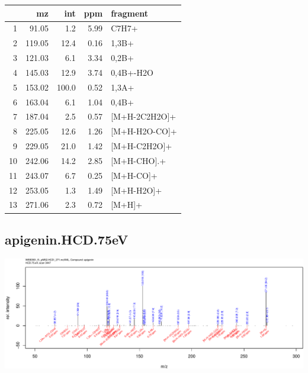\documentclass[]{article}
\begin{document}
\begin{table}[ht]
\centering
\begin{tabular}{rrrrl}
  \toprule
 & mz & int & ppm & fragment \\ 
  \midrule
1 & 91.05 & 1.2 & 5.99 & C7H7+ \\ 
  2 & 119.05 & 12.4 & 0.16 & 1,3B+ \\ 
  3 & 121.03 & 6.1 & 3.34 & 0,2B+ \\ 
  4 & 145.03 & 12.9 & 3.74 & 0,4B+-H2O \\ 
  5 & 153.02 & 100.0 & 0.52 & 1,3A+ \\ 
  6 & 163.04 & 6.1 & 1.04 & 0,4B+ \\ 
  7 & 187.04 & 2.5 & 0.57 & [M+H-2C2H2O]+ \\ 
  8 & 225.05 & 12.6 & 1.26 & [M+H-H2O-CO]+ \\ 
  9 & 229.05 & 21.0 & 1.42 & [M+H-C2H2O]+ \\ 
  10 & 242.06 & 14.2 & 2.85 & [M+H-CHO].+ \\ 
  11 & 243.07 & 6.7 & 0.25 & [M+H-CO]+ \\ 
  12 & 253.05 & 1.3 & 1.49 & [M+H-H2O]+ \\ 
  13 & 271.06 & 2.3 & 0.72 & [M+H]+ \\ 
   \bottomrule
\end{tabular}
\end{table}

\clearpage\subsection{apigenin.HCD.75eV}
\includegraphics[width=\textwidth]{WEB350_files/figure-latex/unnamed-chunk-3-14}
\end{document}
